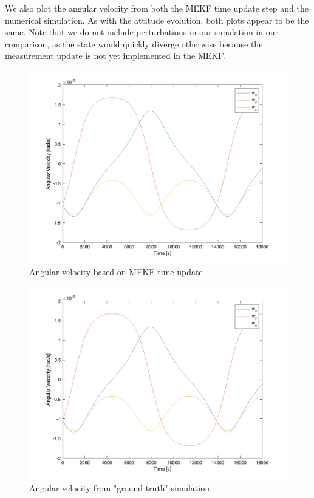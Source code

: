We also plot the angular velocity from both the MEKF time update step and the numerical simulation. As with the attitude evolution, both plots appear to be the same. Note that we do not include perturbations in our simulation in our comparison, as the state would quickly diverge otherwise because the measurement update is not yet implemented in the MEKF.

\begin{figure}[H]
\centering
\includegraphics[scale=0.6]{Images/ps7_problem5a_angvel_est.png}
\caption{Angular velocity based on MEKF time update}
\label{fig:ps7_problem5a_angvel_est}
\end{figure}

\begin{figure}[H]
\centering
\includegraphics[scale=0.6]{Images/ps7_problem5a_angvel_sim.png}
\caption{Angular velocity from "ground truth" simulation}
\label{fig:ps7_problem5a_angvel_sim}
\end{figure}

